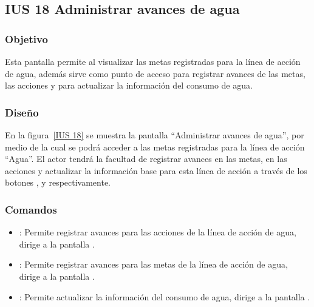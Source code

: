 \subsection{IUS 18 Administrar avances de agua}

\subsubsection{Objetivo}

    Esta pantalla permite al  visualizar las metas registradas para la línea de acción de agua, además sirve como punto de acceso para registrar avances de las metas, las acciones y para actualizar la información del consumo de agua. 
    
\subsubsection{Diseño}

        En la figura~\ref{IUS 18} se muestra la pantalla ``Administrar avances de agua'', por medio de la cual se podrá acceder a las metas registradas para la línea de acción ``Agua''. El actor tendrá la facultad de registrar avances en las metas, en las acciones y actualizar la información base para esta línea de acción a través de los botones \botAcciones, \botMetas y  respectivamente.  



\subsubsection{Comandos}
    \begin{itemize}	
	\item {}: Permite registrar avances para las acciones de la línea de acción de agua, dirige a la pantalla .
	\item {}: Permite registrar avances para las metas de la línea de acción de agua, dirige a la pantalla .	
	\item {}: Permite actualizar la información del consumo de agua, dirige a la pantalla .
    \end{itemize}

